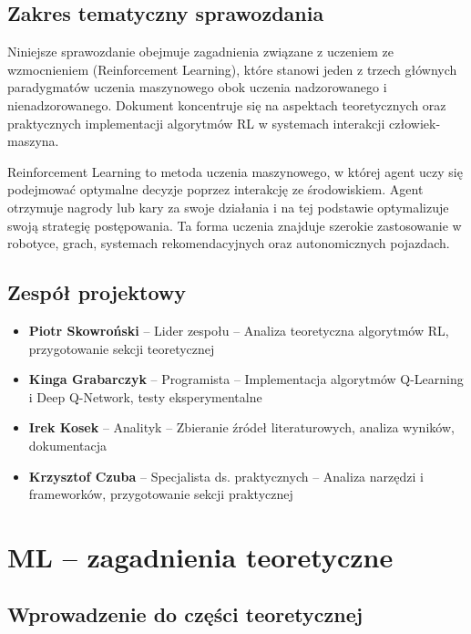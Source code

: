 \documentclass[12pt,a4paper]{article}
\begin{document}
\subsection{Zakres tematyczny sprawozdania}

Niniejsze sprawozdanie obejmuje zagadnienia związane z uczeniem ze wzmocnieniem (Reinforcement Learning), które stanowi jeden z trzech głównych paradygmatów uczenia maszynowego obok uczenia nadzorowanego i nienadzorowanego. Dokument koncentruje się na aspektach teoretycznych oraz praktycznych implementacji algorytmów RL w systemach interakcji człowiek-maszyna.

Reinforcement Learning to metoda uczenia maszynowego, w której agent uczy się podejmować optymalne decyzje poprzez interakcję ze środowiskiem. Agent otrzymuje nagrody lub kary za swoje działania i na tej podstawie optymalizuje swoją strategię postępowania. Ta forma uczenia znajduje szerokie zastosowanie w robotyce, grach, systemach rekomendacyjnych oraz autonomicznych pojazdach.

\subsection{Zespół projektowy}

\begin{itemize}
\item \textbf{Piotr Skowroński} -- Lider zespołu -- Analiza teoretyczna algorytmów RL, przygotowanie sekcji teoretycznej
\item \textbf{Kinga Grabarczyk} -- Programista -- Implementacja algorytmów Q-Learning i Deep Q-Network, testy eksperymentalne
\item \textbf{Irek Kosek} -- Analityk -- Zbieranie źródeł literaturowych, analiza wyników, dokumentacja
\item \textbf{Krzysztof Czuba} -- Specjalista ds. praktycznych -- Analiza narzędzi i frameworków, przygotowanie sekcji praktycznej
\end{itemize}

\newpage

\section{ML -- zagadnienia teoretyczne}

\subsection{Wprowadzenie do części teoretycznej}
\end{document}
